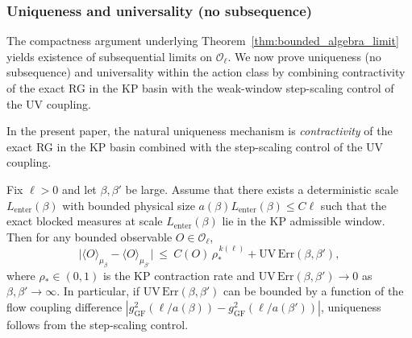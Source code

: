 \subsubsection{Uniqueness and universality (no subsequence)}
\label{subsec:uniqueness_universality}

The compactness argument underlying Theorem~\ref{thm:bounded_algebra_limit} yields existence of subsequential limits on $\mathcal O_{\ell}$. We now prove uniqueness (no subsequence) and universality within the action class by combining contractivity of the exact RG in the KP basin with the weak-window step-scaling control of the UV coupling.

In the present paper, the natural uniqueness mechanism is \emph{contractivity} of the exact RG in the KP basin combined with the
step-scaling control of the UV coupling.

\begin{proposition}\label{prop:uniqueness_reduction}
Fix $\ell>0$ and let $\beta,\beta'$ be large.
Assume that there exists a deterministic scale $L_\mathrm{enter}(\beta)$ with bounded physical size $a(\beta)L_\mathrm{enter}(\beta)\le C\ell$
such that the exact blocked measures at scale $L_\mathrm{enter}(\beta)$ lie in the KP admissible window.
Then for any bounded observable $O\in\mathcal O_{\ell}$,
\[\big|\langle O\rangle_{\mu_{\beta}}-\langle O\rangle_{\mu_{\beta'}}\big|\ \le\ C(O)\,\rho_*^{\,k(\ell)}+\mathrm{UV\,Err}(\beta,\beta'),\]
where $\rho_*\in(0,1)$ is the KP contraction rate and $\mathrm{UV\,Err}(\beta,\beta')\to 0$ as $\beta,\beta'\to\infty$.
In particular, if $\mathrm{UV\,Err}(\beta,\beta')$ can be bounded by a function of the flow coupling difference
$|g^2_{\mathrm{GF}}(\ell/a(\beta)) - g^2_{\mathrm{GF}}(\ell/a(\beta'))|$, uniqueness follows from the step-scaling control.
\end{proposition}

